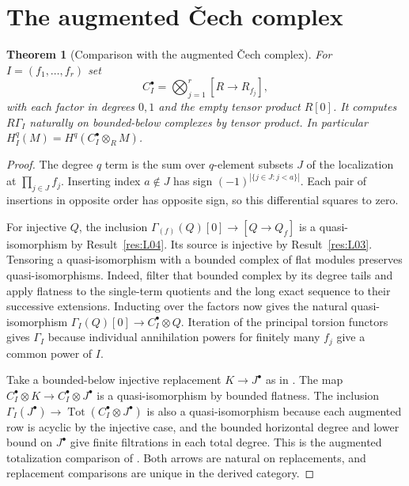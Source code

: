 \documentclass[11pt,oneside,openany]{book}
\newtheorem{theorem}{Theorem}[chapter]
\theoremstyle{definition}
\theoremstyle{remark}
\begin{document}
\section{The augmented \v{C}ech complex}

\begin{theorem}[Comparison with the augmented \v{C}ech complex]\label{res:L05}
For \(I=(f_1,\ldots,f_r)\) set
\[
 C_I^\bullet=\bigotimes_{j=1}^r [R\longrightarrow R_{f_j}],
\]
with each factor in degrees \(0,1\) and the empty tensor product \(R[0]\).
It computes \(R\Gamma_I\) naturally on bounded-below complexes by tensor
product. In particular \(H_I^q(M)=H^q(C_I^\bullet\otimes_R M)\).
\end{theorem}
\begin{proof}
The degree \(q\) term is the sum over \(q\)-element subsets \(J\) of the
localization at \(\prod_{j\in J}f_j\). Inserting index \(a\notin J\)
has sign \((-1)^{|\{j\in J:j<a\}|}\). Each pair of insertions in opposite
order has opposite sign, so this differential squares to zero.

For injective \(Q\), the inclusion
\(\Gamma_{(f)}(Q)[0]\to [Q\to Q_f]\) is a quasi-isomorphism by
Result~\ref{res:L04}. Its source is injective by Result~\ref{res:L03}.
Tensoring a quasi-isomorphism with a bounded complex of flat modules
preserves quasi-isomorphisms. Indeed, filter that bounded complex by
its degree tails and apply flatness to the single-term quotients
and the long exact sequence to their successive extensions.
Inducting over the factors now gives the natural quasi-isomorphism
\(\Gamma_I(Q)[0]\to C_I^\bullet\otimes Q\). Iteration of the principal
torsion functors gives \(\Gamma_I\) because individual annihilation
powers for finitely many \(f_j\) give a common power of \(I\).

Take a bounded-below injective replacement \(K\to J^\bullet\) as in
\cite[R01, R03 and R06]{homological}. The map
\(C_I^\bullet\otimes K\to C_I^\bullet\otimes J^\bullet\) is a
quasi-isomorphism by bounded flatness. The inclusion
\(\Gamma_I(J^\bullet)\to\operatorname{Tot}(C_I^\bullet\otimes J^\bullet)\)
is also a quasi-isomorphism because each augmented row is acyclic by the
injective case, and the bounded horizontal degree and lower bound
on \(J^\bullet\) give finite filtrations in each total degree.
This is the augmented totalization comparison of
\cite[B01--B04]{homological}. Both arrows are natural on replacements,
and replacement comparisons are unique in the derived category.
\end{proof}
\end{document}
